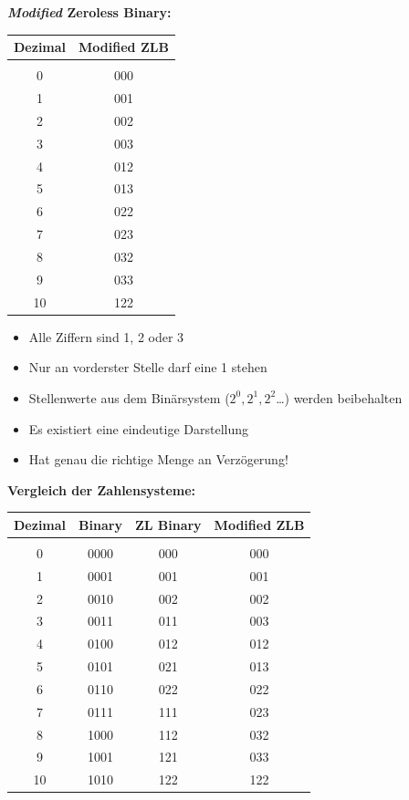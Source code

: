 \documentclass{beamer}
\begin{document}
\begin{frame}
\textbf{\emph{Modified} Zeroless Binary:}

\begin{multicols}{2}

\begin{tabular}{c|c}
Dezimal & Modified ZLB \\ 
\hline
&\\
0&000\\
1&001\\
2&002\\
3&003\\
4&012\\
5&013\\
6&022\\
7&023\\
8&032\\
9&033\\
10&122\\
\end{tabular}
\columnbreak
\pause

\begin{itemize}
\item Alle Ziffern sind 1, 2 oder 3\pause
\item Nur an vorderster Stelle darf eine 1 stehen\pause
\item Stellenwerte aus dem Binärsystem ($2^0, 2^1, 2^2$\dots) werden beibehalten\pause
\item Es existiert eine eindeutige Darstellung\pause
\item Hat genau die richtige Menge an Verzögerung!
\end{itemize}

\end{multicols}
\end{frame}


\begin{frame}
\textbf{Vergleich der Zahlensysteme:}
\smallskip\smallskip

\begin{center}
\begin{tabular}{c|c|c|c}
Dezimal & Binary & ZL Binary & Modified ZLB\\ 
\hline
   &      &     &    \\
0  & 0000 & 000 & 000\\
1  & 0001 & 001 & 001\\
2  & 0010 & 002 & 002\\
3  & 0011 & 011 & 003\\
4  & 0100 & 012 & 012\\
5  & 0101 & 021 & 013\\
6  & 0110 & 022 & 022\\
7  & 0111 & 111 & 023\\
8  & 1000 & 112 & 032\\
9  & 1001 & 121 & 033\\
10 & 1010 & 122 & 122\\
\end{tabular}
\end{center}

\end{frame}
\end{document}
